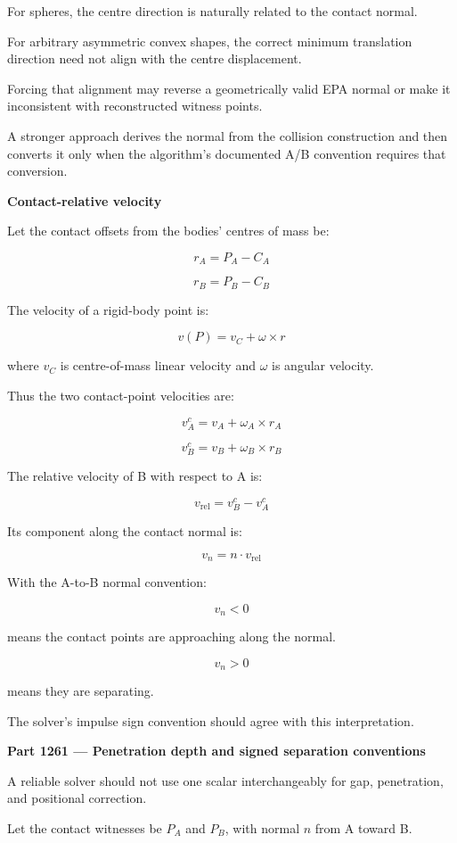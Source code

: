 For spheres, the centre direction is naturally related to the contact normal.

For arbitrary asymmetric convex shapes, the correct minimum translation direction need not align with the centre displacement.

Forcing that alignment may reverse a geometrically valid EPA normal or make it inconsistent with reconstructed witness points.

A stronger approach derives the normal from the collision construction and then converts it only when the algorithm's documented A/B convention requires that conversion.

\textbf{Contact-relative velocity}

Let the contact offsets from the bodies' centres of mass be:

\[
r_A=P_A-C_A
\]

\[
r_B=P_B-C_B
\]

The velocity of a rigid-body point is:

\[
\boxed{ v(P)=v_C+\omega\times r }
\]

where \(v_C\) is centre-of-mass linear velocity and \(\omega\) is angular velocity.

Thus the two contact-point velocities are:

\[
v_A^c=v_A+\omega_A\times r_A
\]

\[
v_B^c=v_B+\omega_B\times r_B
\]

The relative velocity of B with respect to A is:

\[
\boxed{ v_{\mathrm{rel}}=v_B^c-v_A^c }
\]

Its component along the contact normal is:

\[
\boxed{ v_n=n\cdot v_{\mathrm{rel}} }
\]

With the A-to-B normal convention:

\[
v_n<0
\]

means the contact points are approaching along the normal.

\[
v_n>0
\]

means they are separating.

The solver's impulse sign convention should agree with this interpretation.

\textbf{Part 1261 --- Penetration depth and signed separation conventions}

A reliable solver should not use one scalar interchangeably for gap, penetration, and positional correction.

Let the contact witnesses be \(P_A\) and \(P_B\), with normal \(n\) from A toward B.

